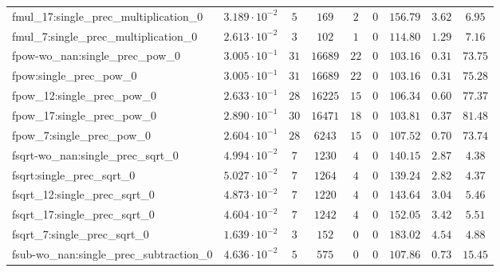 \begin{tabular}{|l|c|c|c|c|c|c|c|c|}
fmul\_17:single\_prec\_multiplication\_0       & $ 3.189 \cdot 10^{-2} $ & $ 5      $ & $ 169    $ & $ 2   $ & $ 0   $ & $ 156.79      $ & $ 3.62    $ & $ 6.95    $ \\
fmul\_7:single\_prec\_multiplication\_0        & $ 2.613 \cdot 10^{-2} $ & $ 3      $ & $ 102    $ & $ 1   $ & $ 0   $ & $ 114.80      $ & $ 1.29    $ & $ 7.16    $ \\
fpow-wo\_nan:single\_prec\_pow\_0              & $ 3.005 \cdot 10^{-1} $ & $ 31     $ & $ 16689  $ & $ 22  $ & $ 0   $ & $ 103.16      $ & $ 0.31    $ & $ 73.75   $ \\
fpow:single\_prec\_pow\_0                      & $ 3.005 \cdot 10^{-1} $ & $ 31     $ & $ 16689  $ & $ 22  $ & $ 0   $ & $ 103.16      $ & $ 0.31    $ & $ 75.28   $ \\
fpow\_12:single\_prec\_pow\_0                  & $ 2.633 \cdot 10^{-1} $ & $ 28     $ & $ 16225  $ & $ 15  $ & $ 0   $ & $ 106.34      $ & $ 0.60    $ & $ 77.37   $ \\
fpow\_17:single\_prec\_pow\_0                  & $ 2.890 \cdot 10^{-1} $ & $ 30     $ & $ 16471  $ & $ 18  $ & $ 0   $ & $ 103.81      $ & $ 0.37    $ & $ 81.48   $ \\
fpow\_7:single\_prec\_pow\_0                   & $ 2.604 \cdot 10^{-1} $ & $ 28     $ & $ 6243   $ & $ 15  $ & $ 0   $ & $ 107.52      $ & $ 0.70    $ & $ 73.74   $ \\
fsqrt-wo\_nan:single\_prec\_sqrt\_0            & $ 4.994 \cdot 10^{-2} $ & $ 7      $ & $ 1230   $ & $ 4   $ & $ 0   $ & $ 140.15      $ & $ 2.87    $ & $ 4.38    $ \\
fsqrt:single\_prec\_sqrt\_0                    & $ 5.027 \cdot 10^{-2} $ & $ 7      $ & $ 1264   $ & $ 4   $ & $ 0   $ & $ 139.24      $ & $ 2.82    $ & $ 4.37    $ \\
fsqrt\_12:single\_prec\_sqrt\_0                & $ 4.873 \cdot 10^{-2} $ & $ 7      $ & $ 1220   $ & $ 4   $ & $ 0   $ & $ 143.64      $ & $ 3.04    $ & $ 5.46    $ \\
fsqrt\_17:single\_prec\_sqrt\_0                & $ 4.604 \cdot 10^{-2} $ & $ 7      $ & $ 1242   $ & $ 4   $ & $ 0   $ & $ 152.05      $ & $ 3.42    $ & $ 5.51    $ \\
fsqrt\_7:single\_prec\_sqrt\_0                 & $ 1.639 \cdot 10^{-2} $ & $ 3      $ & $ 152    $ & $ 0   $ & $ 0   $ & $ 183.02      $ & $ 4.54    $ & $ 4.88    $ \\
fsub-wo\_nan:single\_prec\_subtraction\_0      & $ 4.636 \cdot 10^{-2} $ & $ 5      $ & $ 575    $ & $ 0   $ & $ 0   $ & $ 107.86      $ & $ 0.73    $ & $ 15.45   $ \\

\end{tabular}
